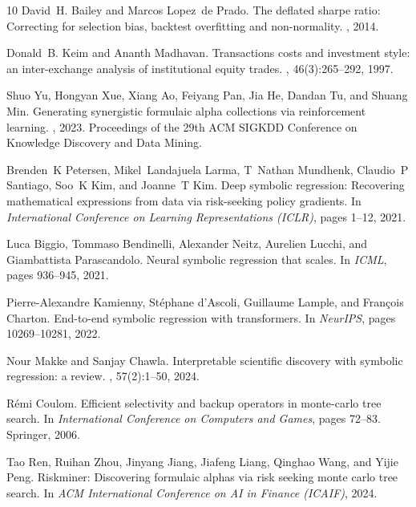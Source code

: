 \documentclass{elektr}
\theoremstyle{corollary}
\theoremstyle{lemma}
\theoremstyle{proposition}
\theoremstyle{axiom}
\theoremstyle{conjecture}
\theoremstyle{example}
\theoremstyle{definition}
\theoremstyle{remark}
\begin{document}
\begin{thebibliography}{10}
David~H. Bailey and Marcos Lopez~de Prado.
\newblock The deflated sharpe ratio: Correcting for selection bias, backtest overfitting and non-normality.
, 2014.

Donald~B. Keim and Ananth Madhavan.
\newblock Transactions costs and investment style: an inter-exchange analysis of institutional equity trades.
, 46(3):265--292, 1997.

Shuo Yu, Hongyan Xue, Xiang Ao, Feiyang Pan, Jia He, Dandan Tu, and Shuang Min.
\newblock Generating synergistic formulaic alpha collections via reinforcement learning.
, 2023.
\newblock Proceedings of the 29th ACM SIGKDD Conference on Knowledge Discovery and Data Mining.

Brenden~K Petersen, Mikel~Landajuela Larma, T~Nathan Mundhenk, Claudio~P Santiago, Soo~K Kim, and Joanne~T Kim.
\newblock Deep symbolic regression: Recovering mathematical expressions from data via risk-seeking policy gradients.
\newblock In {\em International Conference on Learning Representations (ICLR)}, pages 1--12, 2021.

Luca Biggio, Tommaso Bendinelli, Alexander Neitz, Aurelien Lucchi, and Giambattista Parascandolo.
\newblock Neural symbolic regression that scales.
\newblock In {\em ICML}, pages 936--945, 2021.

Pierre-Alexandre Kamienny, St{\'e}phane d'Ascoli, Guillaume Lample, and Fran{\c{c}}ois Charton.
\newblock End-to-end symbolic regression with transformers.
\newblock In {\em NeurIPS}, pages 10269--10281, 2022.

Nour Makke and Sanjay Chawla.
\newblock Interpretable scientific discovery with symbolic regression: a review.
, 57(2):1--50, 2024.

R{\'e}mi Coulom.
\newblock Efficient selectivity and backup operators in monte-carlo tree search.
\newblock In {\em International Conference on Computers and Games}, pages 72--83. Springer, 2006.

Tao Ren, Ruihan Zhou, Jinyang Jiang, Jiafeng Liang, Qinghao Wang, and Yijie Peng.
\newblock Riskminer: Discovering formulaic alphas via risk seeking monte carlo tree search.
\newblock In {\em ACM International Conference on AI in Finance (ICAIF)}, 2024.


\end{thebibliography}
\end{document}
